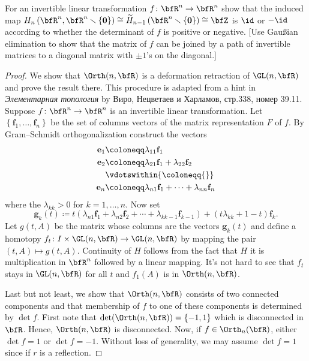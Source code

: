 \begin{problem}[Hatcher {\S}2.2, Ex.\@ 7]
For an invertible linear transformation $f\colon\bfR^n\to\bfR^n$ show that
the induced map
$H_n\left(\bfR^n,\bfR^n\smallsetminus\{\mathbf{0}\}\right)\cong\widetilde
H_{n-1}\left(\bfR^n\smallsetminus\{\mathbf{0}\}\right)\cong\bfZ$ is $\id$ or $-\id$
according to whether the determinant of $f$ is positive or negative. [Use
Gaußian elimination to show that the matrix of $f$ can be joined by a path
of invertible matrices to a diagonal matrix with $\pm 1$'s on the
diagonal.]
\end{problem}
\begin{proof}
We show that $\Orth(n,\bfR)$ is a deformation retraction of $\GL(n,\bfR)$
and prove the result there. This procedure is adapted from a hint in
\emph{Элементарная топология} by Виро, Нецветаев и
  Харламов, стр.\@ 338, номер 39.11. Suppose $f\colon\bfR^n\to\bfR^n$ is
an invertible linear transformation. Let
$\left\{\mathbf{f}_1,\dotsc,\mathbf{f}_n\right\}$ be the set of columns
vectors of the matrix representation $F$ of $f$. By
Gram--Schmidt orthogonalization construct the vectors
\begin{equation}
\label{eq:gram-schmidt-orth}
\begin{aligned}
\mathbf{e}_1&\coloneqq\lambda_{11}\mathbf{f}_1\\
\mathbf{e}_2&\coloneqq\lambda_{21}\mathbf{f}_1+\lambda_{22}\mathbf{f}_2\\
&\vdotswithin{{}\coloneqq{}}\\
\mathbf{e}_n&\coloneqq\lambda_{n1}\mathbf{f}_1+\dotsb+\lambda_{nn}\mathbf{f}_n
\end{aligned}
\end{equation}
where the $\lambda_{kk}>0$ for $k=1,\dotsc,n$. Now set
\begin{equation}
\label{eq:vectors-as-function-of-t}
\mathbf{g}_k(t)\coloneqq
t\left(\lambda_{n1}\mathbf{f}_1+\lambda_{n2}\mathbf{f}_2+\dotsb+\lambda_{kk-1}\mathbf{f}_{k-1}\right)+(t\lambda_{kk}+1-t)\mathbf{f}_k.
\end{equation}
Let $g(t,A)$ be the matrix whose columns are the vectors $\mathbf{g}_k(t)$
and define a homotopy $f_t\colon I\times\GL(n,\bfR)\to\GL(n,\bfR)$ by mapping
the pair $(t,A)\mapsto g(t,A)$. Continuity of $H$ follows from the fact
that $H$ it is multiplication in $\bfR^n$ followed by a linear
mapping. It's not hard to see that $f_t$ stays in $\GL(n,\bfR)$ for all $t$
and $f_1(A)$ is in $\Orth(n,\bfR)$.

Last but not least, we show that $\Orth(n,\bfR)$ consists of two connected
components and that membership of $f$ to one of these components is
determined by $\det f$. First note that
$\det(\Orth(n,\bfR))=\{-1,1\}$ which is disconnected in
$\bfR$. Hence, $\Orth(n,\bfR)$ is disconnected. Now, if
$f\in\Orth_n(\bfR)$, either $\det f=1$ or $\det f=-1$. Without loss of
generality, we may assume $\det f=1$ since if $r$ is a reflection.


\end{proof}
